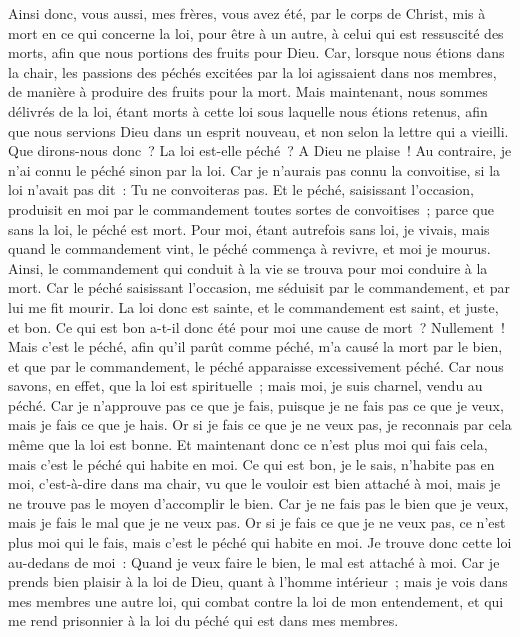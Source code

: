 \begin{multicols}{2}
Ainsi donc, vous aussi, mes frères, vous avez été, par le corps de Christ, mis à mort en ce qui concerne la loi, pour être à un autre, à celui qui est ressuscité des morts, afin que nous portions des fruits pour Dieu.
Car, lorsque nous étions dans la chair, les passions des péchés excitées par la loi agissaient dans nos membres, de manière à produire des fruits pour la mort.
Mais maintenant, nous sommes délivrés de la loi, étant morts à cette loi sous laquelle nous étions retenus, afin que nous servions Dieu dans un esprit nouveau, et non selon la lettre qui a vieilli.
Que dirons-nous donc~? La loi est-elle péché~? A Dieu ne plaise~! Au contraire, je n'ai connu le péché sinon par la loi. Car je n'aurais pas connu la convoitise, si la loi n'avait pas dit~: Tu ne convoiteras pas.
Et le péché, saisissant l'occasion, produisit en moi par le commandement toutes sortes de convoitises~; parce que sans la loi, le péché est mort.
Pour moi, étant autrefois sans loi, je vivais, mais quand le commandement vint, le péché commença à revivre, et moi je mourus.
Ainsi, le commandement qui conduit à la vie se trouva pour moi conduire à la mort.
Car le péché saisissant l'occasion, me séduisit par le commandement, et par lui me fit mourir.
La loi donc est sainte, et le commandement est saint, et juste, et bon.
Ce qui est bon a-t-il donc été pour moi une cause de mort~? Nullement~! Mais c'est le péché, afin qu'il parût comme péché, m'a causé la mort par le bien, et que par le commandement, le péché apparaisse excessivement péché.
Car nous savons, en effet, que la loi est spirituelle~; mais moi, je suis charnel, vendu au péché.
Car je n'approuve pas ce que je fais, puisque je ne fais pas ce que je veux, mais je fais ce que je hais.
Or si je fais ce que je ne veux pas, je reconnais par cela même que la loi est bonne.
Et maintenant donc ce n'est plus moi qui fais cela, mais c'est le péché qui habite en moi.
Ce qui est bon, je le sais, n'habite pas en moi, c'est-à-dire dans ma chair, vu que le vouloir est bien attaché à moi, mais je ne trouve pas le moyen d'accomplir le bien.
Car je ne fais pas le bien que je veux, mais je fais le mal que je ne veux pas.
Or si je fais ce que je ne veux pas, ce n'est plus moi qui le fais, mais c'est le péché qui habite en moi.
Je trouve donc cette loi au-dedans de moi~: Quand je veux faire le bien, le mal est attaché à moi.
Car je prends bien plaisir à la loi de Dieu, quant à l'homme intérieur~;
mais je vois dans mes membres une autre loi, qui combat contre la loi de mon entendement, et qui me rend prisonnier à la loi du péché qui est dans mes membres.

\end{multicols}
